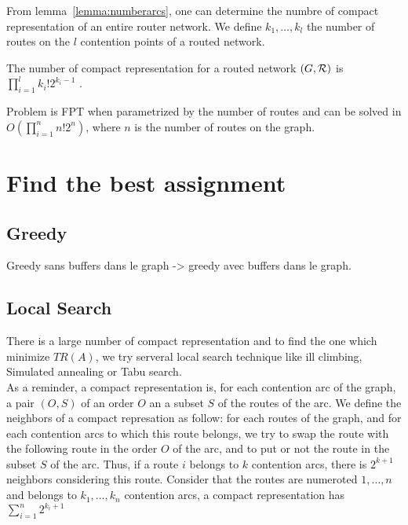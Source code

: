 \documentclass[english]{article}
\begin{document}
From lemma~\ref{lemma:numberarcs}, one can determine the numbre of compact representation of an entire router network.
We define $k_1,\ldots,k_l$ the number of routes on the $l$ contention points of a routed network.
\begin{theorem}
 The number of compact representation for a routed network $(G,\cal{R})$ is $\prod_{i=1}^l k_i!2^{k_i-1}$ .
 \label{theorem:numbergraph}
\end{theorem}


\begin{corollary}
 Problem \spall is FPT when parametrized by the number of routes and can be solved in $O(\prod_{i=1}^n n!2^{n})$, where $n$ is the number of routes on the graph.
\end{corollary}



\section{Find the best assignment}
\subsection{Greedy}
Greedy sans buffers dans le graph -> greedy avec buffers dans le graph.

\subsection{Local Search}

There is a large number of compact representation and to find the one which minimize $TR(A)$, we try serveral local search technique like ill climbing, Simulated annealing or Tabu search.\\

As a reminder, a compact representation is, for each contention arc of the graph, a pair $(O,S)$ of an order $O$ an a subset $S$ of the routes of the arc.
We define the neighbors of a compact represation as follow: for each routes of the graph, and for each contention arcs to which this route belongs, we try to swap the route with the following route in the order $O$ of the arc, and to put or not the route in the subset $S$ of the arc. Thus, if a route $i$ belongs to $k$ contention arcs, there is $2^{k+1}$ neighbors considering this route. Consider that the routes are numeroted $1,\ldots,n$ and belongs to $k_1,\ldots,k_n$ contention arcs, a compact representation has $\sum_{i=1}^n 2^{k_i +1} $ 
\end{document}
